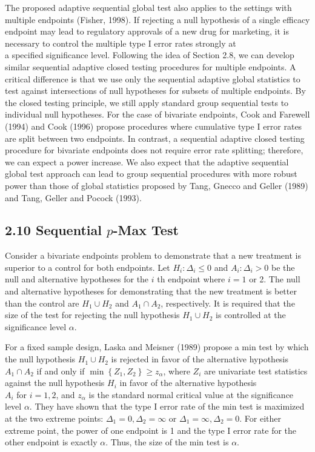 \documentclass[10pt]{article}
\begin{document}
The proposed adaptive sequential global test also applies to the settings with multiple endpoints (Fisher, 1998). If rejecting a null hypothesis of a single efficacy endpoint may lead to regulatory approvals of a new drug for marketing, it is necessary to control the multiple type I error rates strongly at\\
a specified significance level. Following the idea of Section 2.8, we can develop similar sequential adaptive closed testing procedures for multiple endpoints. A critical difference is that we use only the sequential adaptive global statistics to test against intersections of null hypotheses for subsets of multiple endpoints. By the closed testing principle, we still apply standard group sequential tests to individual null hypotheses. For the case of bivariate endpoints, Cook and Farewell (1994) and Cook (1996) propose procedures where cumulative type I error rates are split between two endpoints. In contrast, a sequential adaptive closed testing procedure for bivariate endpoints does not require error rate splitting; therefore, we can expect a power increase. We also expect that the adaptive sequential global test approach can lead to group sequential procedures with more robust power than those of global statistics proposed by Tang, Gnecco and Geller (1989) and Tang, Geller and Pocock (1993).

\subsection*{2.10 Sequential $p$-Max Test}
Consider a bivariate endpoints problem to demonstrate that a new treatment is superior to a control for both endpoints. Let $H_{i}: \Delta_{i} \leq 0$ and $A_{i}: \Delta_{i}>0$ be the null and alternative hypotheses for the $i$ th endpoint where $i=1$ or 2. The null and alternative hypotheses for demonstrating that the new treatment is better than the control are $H_{1} \cup H_{2}$ and $A_{1} \cap A_{2}$, respectively. It is required that the size of the test for rejecting the null hypothesis $H_{1} \cup H_{2}$ is controlled at the significance level $\alpha$.

For a fixed sample design, Laska and Meisner (1989) propose a min test by which the null hypothesis $H_{1} \cup H_{2}$ is rejected in favor of the alternative hypothesis $A_{1} \cap A_{2}$ if and only if $\min \left\{Z_{1}, Z_{2}\right\} \geq z_{\alpha}$, where $Z_{i}$ are univariate test statistics against the null hypothesis $H_{i}$ in favor of the alternative hypothesis\\
$A_{i}$ for $i=1,2$, and $z_{\alpha}$ is the standard normal critical value at the significance level $\alpha$. They have shown that the type I error rate of the min test is maximized at the two extreme points: $\Delta_{1}=0, \Delta_{2}=\infty$ or $\Delta_{1}=\infty, \Delta_{2}=0$. For either extreme point, the power of one endpoint is 1 and the type I error rate for the other endpoint is exactly $\alpha$. Thus, the size of the min test is $\alpha$.
\end{document}
